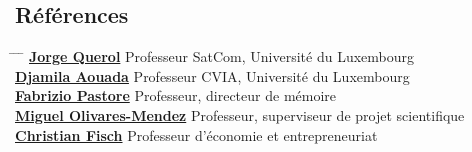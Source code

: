 \documentclass[a4paper,10pt]{article}
\begin{document}
\subsection*{Références}
\begin{tabbing}
    \hspace{0.55cm} \= \hspace{4.55cm} \= \hspace{3cm} \= \kill
    \> \href{https://www.linkedin.com/in/jorgequerol/}{\textbf{Jorge Querol}}  \> Professeur SatCom, Université du Luxembourg\\
    \> \href{https://www.linkedin.com/in/djamilaaouada/}{\textbf{Djamila Aouada}}  \> Professeur CVIA, Université du Luxembourg\\
    \> \href{https://www.linkedin.com/in/fabrizio-pastore-41226b4/}{\textbf{Fabrizio Pastore}}  \> Professeur, directeur de mémoire\\
    \> \href{https://www.linkedin.com/in/miguel-a-olivares-mendez-8a952533/}{\textbf{Miguel Olivares-Mendez}}  \> Professeur, superviseur de projet scientifique\\
    \> \href{https://www.linkedin.com/in/christian-fisch-7745ba167/}{\textbf{Christian Fisch}}  \> Professeur d'économie et entrepreneuriat\\
\end{tabbing}
\end{document}
